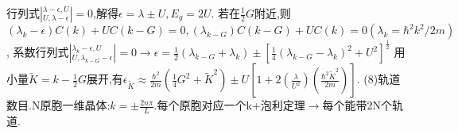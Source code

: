\documentclass[UTF8,a4paper,3pt,twocolumn]{ctexart}
\begin{document}
\begin{itemize}
  行列式$|^{\lambda-\epsilon,U}_{U,\lambda-\epsilon}|=0$,解得$\epsilon=\lambda\pm U,E_g=2U$.
  若在$\frac{1}{2}G$附近,则$(\lambda_k-\epsilon)C(k)+UC(k-G)=0,(\lambda_{k-G})C(k-G)+UC(k)=0(\lambda_k=\hbar^2k^2/2m)$,
  系数行列式$|^{\lambda_k-\epsilon,U}_{U,\lambda_{k-G}-\epsilon}|=0\rightarrow\epsilon=\frac{1}{2}(\lambda_{k-G}+\lambda_k)\pm[\frac{1}{4}(\lambda_{k-G}-\lambda_k)^2+U^2]^\frac{1}{2}$
  用小量$\widetilde{K}=k-\frac{1}{2}G$展开,有$\epsilon_{\widetilde{K}}\approx\frac{\hbar^2}{2m}(\frac{1}{4}G^2+\widetilde{K}^2)\pm U[1+2(\frac{\lambda}{U^2})(\frac{\hbar^2\widetilde{K}^2}{2m})]$.
  (8)轨道数目.N原胞一维晶体:$k=\pm\frac{2n\pi}{L}$.每个原胞对应一个k+泡利定理$\rightarrow$每个能带2N个轨道.

\end{itemize}



\end{document}
